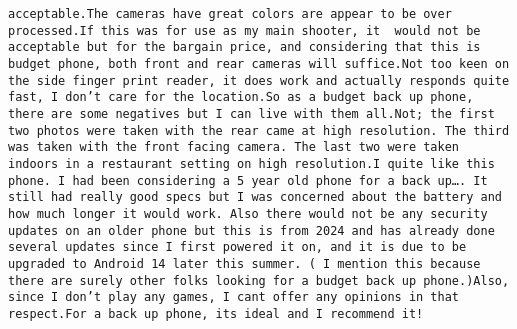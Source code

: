 \documentclass[
  11pt,
]{article}
\begin{document}
\begin{verbatim}
acceptable.The cameras have great colors are appear to be over processed.If this was for use as my main shooter, it  would not be acceptable but for the bargain price, and considering that this is  budget phone, both front and rear cameras will suffice.Not too keen on the side finger print reader, it does work and actually responds quite fast, I don’t care for the location.So as a budget back up phone, there are some negatives but I can live with them all.Not; the first two photos were taken with the rear came at high resolution. The third was taken with the front facing camera. The last two were taken indoors in a restaurant setting on high resolution.I quite like this phone. I had been considering a 5 year old phone for a back up…. It still had really good specs but I was concerned about the battery and how much longer it would work. Also there would not be any security updates on an older phone but this is from 2024 and has already done several updates since I first powered it on, and it is due to be upgraded to Android 14 later this summer. ( I mention this because there are surely other folks looking for a budget back up phone.)Also, since I don’t play any games, I cant offer any opinions in that respect.For a back up phone, its ideal and I recommend it!

\end{verbatim}
\end{document}
